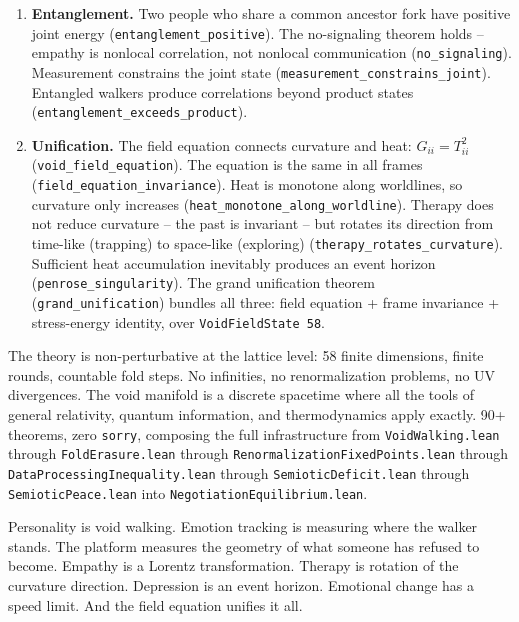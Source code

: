 \documentclass[
  11pt,
]{article}
\begin{document}
\begin{enumerate}
  (\texttt{unbroken\_symmetry\_freezes}). This is why some personality
  traits feel ``stuck'' -- the underlying symmetry hasn't been broken
  yet.
\item
  \textbf{Entanglement.} Two people who share a common ancestor fork
  have positive joint energy (\texttt{entanglement\_positive}). The
  no-signaling theorem holds -- empathy is nonlocal correlation, not
  nonlocal communication (\texttt{no\_signaling}). Measurement
  constrains the joint state (\texttt{measurement\_constrains\_joint}).
  Entangled walkers produce correlations beyond product states
  (\texttt{entanglement\_exceeds\_product}).
\item
  \textbf{Unification.} The field equation connects curvature and heat:
  \(G_{ii} = T_{ii}^2\) (\texttt{void\_field\_equation}). The equation
  is the same in all frames (\texttt{field\_equation\_invariance}). Heat
  is monotone along worldlines, so curvature only increases
  (\texttt{heat\_monotone\_along\_worldline}). Therapy does not reduce
  curvature -- the past is invariant -- but rotates its direction from
  time-like (trapping) to space-like (exploring)
  (\texttt{therapy\_rotates\_curvature}). Sufficient heat accumulation
  inevitably produces an event horizon (\texttt{penrose\_singularity}).
  The grand unification theorem (\texttt{grand\_unification}) bundles
  all three: field equation + frame invariance + stress-energy identity,
  over \texttt{VoidFieldState\ 58}.
\end{enumerate}

The theory is non-perturbative at the lattice level: 58 finite
dimensions, finite rounds, countable fold steps. No infinities, no
renormalization problems, no UV divergences. The void manifold is a
discrete spacetime where all the tools of general relativity, quantum
information, and thermodynamics apply exactly. 90+ theorems, zero
\texttt{sorry}, composing the full infrastructure from
\texttt{VoidWalking.lean} through \texttt{FoldErasure.lean} through
\texttt{RenormalizationFixedPoints.lean} through
\texttt{DataProcessingInequality.lean} through
\texttt{SemioticDeficit.lean} through \texttt{SemioticPeace.lean} into
\texttt{NegotiationEquilibrium.lean}.

Personality is void walking. Emotion tracking is measuring where the
walker stands. The platform measures the geometry of what someone has
refused to become. Empathy is a Lorentz transformation. Therapy is
rotation of the curvature direction. Depression is an event horizon.
Emotional change has a speed limit. And the field equation unifies it
all.
\end{document}
